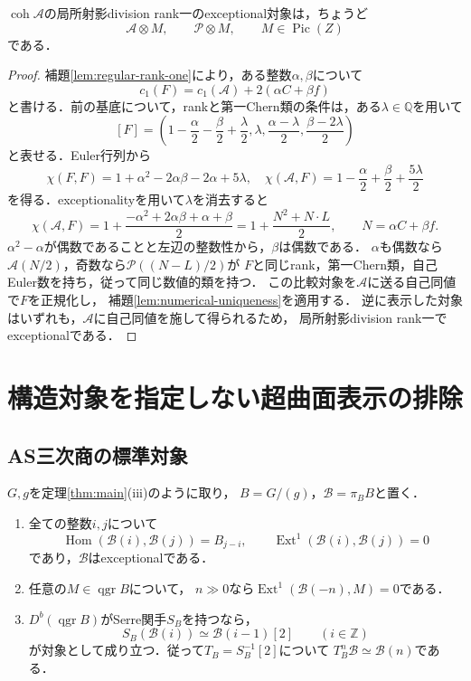 \begin{proposition}\label{prop:exceptional-rank-one}
$\operatorname{coh}\mathcal A$の局所射影division rank一のexceptional対象は，ちょうど
\[
 \mathcal A\otimes M,\qquad\mathcal P\otimes M,
 \qquad M\in\operatorname{Pic}(Z)
\]
である．
\end{proposition}
\begin{proof}
補題\ref{lem:regular-rank-one}により，ある整数$\alpha,\beta$について
\[
 c_1(F)=c_1(\mathcal A)+2(\alpha C+\beta f)
\]
と書ける．前の基底について，rankと第一Chern類の条件は，ある$\lambda\in\mathbb Q$を用いて
\[
 [F]=\left(1-\frac\alpha2-\frac\beta2+\frac\lambda2,
 \lambda,\frac{\alpha-\lambda}{2},\frac{\beta-2\lambda}{2}\right)
\]
と表せる．Euler行列から
\[
 \chi(F,F)=1+\alpha^2-2\alpha\beta-2\alpha+5\lambda,
 \quad
 \chi(\mathcal A,F)=1-\frac\alpha2+\frac\beta2+\frac{5\lambda}{2}
\]
を得る．exceptionalityを用いて$\lambda$を消去すると
\[
 \chi(\mathcal A,F)=1+\frac{-\alpha^2+2\alpha\beta+\alpha+\beta}{2}
 =1+\frac{N^2+N\cdot L}{2},\qquad N=\alpha C+\beta f.
\]
$\alpha^2-\alpha$が偶数であることと左辺の整数性から，$\beta$は偶数である．
$\alpha$も偶数なら$\mathcal A(N/2)$，奇数なら$\mathcal P((N-L)/2)$が
$F$と同じrank，第一Chern類，自己Euler数を持ち，従って同じ数値的類を持つ．
この比較対象を$\mathcal A$に送る自己同値で$F$を正規化し，
補題\ref{lem:numerical-uniqueness}を適用する．
逆に表示した対象はいずれも，$\mathcal A$に自己同値を施して得られるため，
局所射影division rank一でexceptionalである．
\end{proof}

\section{構造対象を指定しない超曲面表示の排除}
\label{sec:unpointed-obstruction}

\subsection{AS三次商の標準対象}

\begin{lemma}\label{lem:AS-cubic-cohomology}
$G,g$を定理\ref{thm:main}(iii)のように取り，
$B=G/(g)$，$\mathcal B=\pi_BB$と置く．
\begin{enumerate}[label=(\roman*)]
\item 全ての整数$i,j$について
\[
 \operatorname{Hom}(\mathcal B(i),\mathcal B(j))=B_{j-i},\qquad
 \operatorname{Ext}^1(\mathcal B(i),\mathcal B(j))=0
\]
であり，$\mathcal B$はexceptionalである．
\item 任意の$M\in\operatorname{qgr}B$について，
$n\gg0$なら$\operatorname{Ext}^1(\mathcal B(-n),M)=0$である．
\item $D^b(\operatorname{qgr}B)$がSerre関手$S_B$を持つなら，
\[
 S_B(\mathcal B(i))\simeq\mathcal B(i-1)[2]
 \qquad(i\in\mathbb Z)
\]
が対象として成り立つ．従って$T_B=S_B^{-1}[2]$について
$T_B^n\mathcal B\simeq\mathcal B(n)$である．
\end{enumerate}
\end{lemma}

